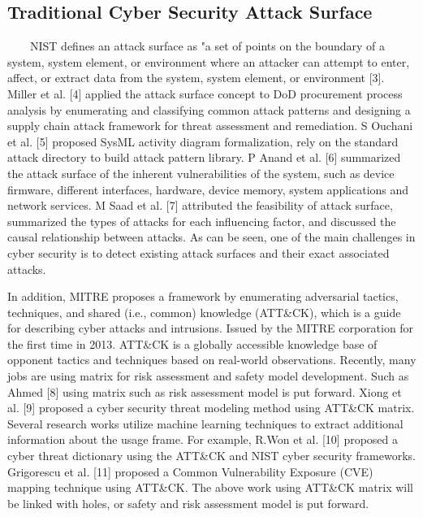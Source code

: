 \documentclass[runningheads]{llncs}
\begin{document}
\subsection{Traditional Cyber Security Attack Surface}
\ \ \ \ NIST defines an attack surface as "a set of points on the boundary of a system, system element, or environment where an attacker can attempt to enter, affect, or extract data from the system, system element, or environment [3]. Miller et al. [4] applied the attack surface concept to DoD procurement process analysis by enumerating and classifying common attack patterns and designing a supply chain attack framework for threat assessment and remediation. S Ouchani et al. [5] proposed SysML activity diagram formalization, rely on the standard attack directory to build attack pattern library. P Anand et al. [6] summarized the attack surface of the inherent vulnerabilities of the system, such as device firmware, different interfaces, hardware, device memory, system applications and network services. M Saad et al. [7] attributed the feasibility of attack surface, summarized the types of attacks for each influencing factor, and discussed the causal relationship between attacks. As can be seen, one of the main challenges in cyber security is to detect existing attack surfaces and their exact associated attacks.\par
%
In addition, MITRE proposes a framework by enumerating adversarial tactics, techniques, and shared (i.e., common) knowledge (ATT\&CK), which is a guide for describing cyber attacks and intrusions. Issued by the MITRE corporation for the first time in 2013. ATT\&CK is a globally accessible knowledge base of opponent tactics and techniques based on real-world observations. Recently, many jobs are using matrix for risk assessment and safety model development. Such as Ahmed [8] using matrix such as risk assessment model is put forward. Xiong et al. [9] proposed a cyber security threat modeling method using ATT\&CK matrix. Several research works utilize machine learning techniques to extract additional information about the usage frame. For example, R.Won et al. [10] proposed a cyber threat dictionary using the ATT\&CK and NIST cyber security frameworks. Grigorescu et al. [11] proposed a Common Vulnerability Exposure (CVE) mapping technique using ATT\&CK. The above work using ATT\&CK matrix will be linked with holes, or safety and risk assessment model is put forward.\par
%
\end{document}
